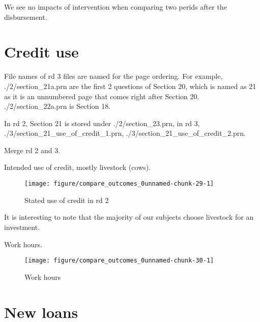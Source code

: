 We see no impacts of intervention when comparing two perids after the disbursement. 

\section{Credit use}


File names of rd 3 files are named for the page ordering. For example, \textsf{\footnotesize./2/section\_21a.prn} are the first 2 questions of Section 20, which is named as 21 as it is an unnumbered page that comes right after Section 20. \textsf{\footnotesize./2/section\_22a.prn} is Section 18.

In rd 2, Section 21 is stored under \textsf{\footnotesize./2/section\_23.prn}, in rd 3, \textsf{\footnotesize./3/section\_21\_use\_of\_credit\_1.prn, ./3/section\_21\_use\_of\_credit\_2.prn}.


Merge rd 2 and 3.


Intended use of credit, mostly livestock (cows).
\begin{Schunk}
\begin{figure}

{\centering \texttt{[image: figure/compare\_outcomes\_0unnamed-chunk-29-1]} 

}

\caption[Stated use of credit in rd 2]{Stated use of credit in rd 2}\label{Figureunnamed-chunk-29}
\end{figure}
\end{Schunk}
It is interesting to note that the majority of our subjects choose livestock for an investment. 

Work hours.
\begin{Schunk}
\begin{figure}

{\centering \texttt{[image: figure/compare\_outcomes\_0unnamed-chunk-30-1]} 

}

\caption[Work hours]{Work hours}\label{Figureunnamed-chunk-30}
\end{figure}
\end{Schunk}

\section{New loans}

